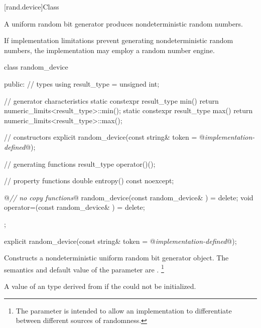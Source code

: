 

[rand.device]{Class }%
%

\pnum
A 
uniform random bit generator
produces nondeterministic random numbers.

\pnum
If implementation limitations%
prevent generating nondeterministic random numbers,
the implementation may employ a random number engine.

%
\begin{codeblock}
class random_device {
public:
  // types
  using result_type = unsigned int;

  // generator characteristics
  static constexpr result_type min() { return numeric_limits<result_type>::min(); }
  static constexpr result_type max() { return numeric_limits<result_type>::max(); }

  // constructors
  explicit random_device(const string& token = @\textit{implementation-defined}@);

  // generating functions
  result_type operator()();

  // property functions
  double entropy() const noexcept;

  @\textit{// no copy functions}@
  random_device(const random_device& ) = delete;
  void operator=(const random_device& ) = delete;
};
\end{codeblock}


%
\begin{itemdecl}
explicit random_device(const string& token = @\textit{implementation-defined}@);
\end{itemdecl}

\begin{itemdescr}
\pnum\effects Constructs a 
 nondeterministic uniform random bit generator object.
 The semantics and default value of the 
 parameter are
 .%
\footnote{The parameter is intended
   to allow an implementation to differentiate
   between different sources of randomness.
 }

\pnum
\throws A value of an  type
 derived from 
 if the  could not be initialized.
\end{itemdescr}

